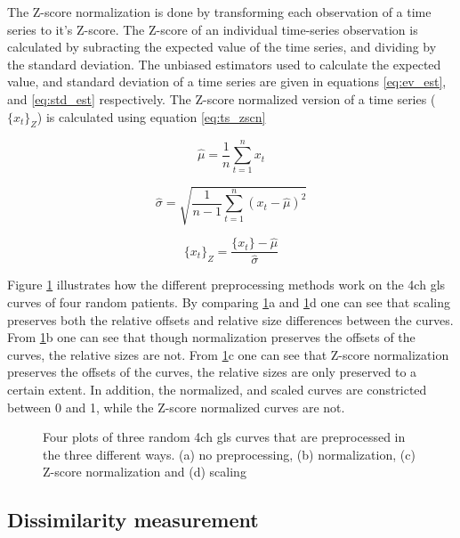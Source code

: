 The Z-score normalization is done by transforming each observation of a time series to it's Z-score. The Z-score of an individual time-series observation is calculated by subracting the expected value of the time series, and dividing by the standard deviation. The unbiased estimators used to calculate the expected value, and standard deviation of a time series are given in equations \eqref{eq:ev_est}, and \eqref{eq:std_est} respectively. The Z-score normalized version of a time series ($\{x_t\}_Z$) is calculated using equation \eqref{eq:ts_zscn}

\begin{equation}
    \hat{\mu} = \frac{1}{n} \sum^n_{t = 1} x_t
    \label{eq:ev_est}
\end{equation}

\begin{equation}
    \hat{\sigma} = \sqrt{\frac{1}{n - 1} \sum^n_{t = 1} (x_t - \hat{\mu})^2}
    \label{eq:std_est}
\end{equation}

\begin{equation}
    \{x_t\}_Z = \frac{\{x_t\} - \hat{\mu}}{\hat{\sigma}}
    \label{eq:ts_zscn}
\end{equation}

Figure \ref{fig:preproc} illustrates how the different preprocessing methods work on the \acrshort{4ch} \acrshort{gls} curves of four random patients. By comparing \ref{fig:preproc}a and \ref{fig:preproc}d one can see that scaling preserves both the relative offsets and relative size differences between the curves. From \ref{fig:preproc}b one can see that though normalization preserves the offsets of the curves, the relative sizes are not. From \ref{fig:preproc}c one can see that Z-score normalization preserves the offsets of the curves, the relative sizes are only preserved to a certain extent. In addition, the normalized, and scaled curves are constricted between 0 and 1, while the Z-score normalized curves are not.  

\begin{figure}
    \centering
    
    \caption{Four plots of three random \acrshort{4ch} \acrshort{gls} curves that are preprocessed in the three different ways. (a) no preprocessing, (b) normalization, (c) Z-score normalization and (d) scaling}
    \label{fig:preproc}
\end{figure}

\subsection{Dissimilarity measurement}

